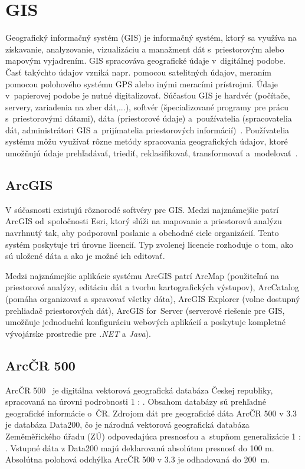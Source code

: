 \section{GIS}
Geografický informačný systém (GIS) je informačný systém, ktorý sa využíva na získavanie, analyzovanie, vizualizáciu a manažment dát s~priestorovým alebo mapovým vyjadrením. GIS spracováva geografické údaje v~digitálnej podobe. Časť takýchto údajov vzniká napr. pomocou satelitných údajov, meraním pomocou polohového systému GPS alebo inými meracími prístrojmi. Údaje v~papierovej podobe je nutné digitalizovať. Súčasťou GIS je hardvér (počítače, servery, zariadenia na zber dát,...), softvér (špecializované programy pre prácu s~priestorovými dátami), dáta (priestorové údaje) a~používatelia (spracovatelia dát, administrátori GIS a~prijímatelia priestorových informácií)~\cite{introductiontogis}. Používatelia systému môžu využívať rôzne metódy spracovania geografických údajov, ktoré umožňujú údaje prehľadávať, triediť, reklasifikovať, transformovať a~modelovať~\cite{hofierka2003gis}.

\subsection{ArcGIS}
V súčasnosti existujú rôznorodé softvéry pre GIS. Medzi najznámejšie patrí ArcGIS od~spoločnosti Esri, ktorý slúži na mapovanie a priestorovú analýzu navrhnutý tak, aby podporoval poslanie a obchodné ciele organizácií. Tento systém poskytuje tri úrovne licencií. Typ zvolenej licencie rozhoduje o tom, ako sú uložené dáta a ako je možné ich editovať. 

Medzi najznámejšie aplikácie systému ArcGIS patrí ArcMap (použiteľná na priestorové analýzy, editáciu dát a tvorbu kartografických výstupov), ArcCatalog (pomáha organizovať a spravovať všetky dáta), ArcGIS Explorer (volne dostupný prehliadač priestorových dát), ArcGIS for~Server (serverové riešenie pre GIS, umožňuje jednoduchú konfiguráciu webových aplikácií a poskytuje kompletné vývojárske prostredie pre \emph{.NET} a \emph{Java}).

\subsection{ArcČR 500}
ArcČR 500~\cite{arcgis} je digitálna vektorová geografická databáza Českej republiky, spracovaná na úrovni podrobnosti 1 : . Obsahom databázy sú prehľadné geografické informácie o~ČR. Zdrojom dát pre geografické dáta ArcČR 500 v 3.3 je databáza Data200, čo je národná vektorová geografická databáza Zeměměřického úřadu (ZÚ) odpovedajúca presnosťou a~stupňom generalizácie 1 : . Vstupné dáta z Data200 majú deklarovanú absolútnu presnosť do 100 m. Absolútna polohová odchýlka ArcČR 500 v 3.3 je odhadovaná do 200~m.

